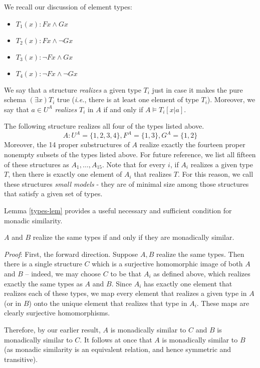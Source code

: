 We recall our discussion of element types:
\begin{itemize}
\item $T_1(x): Fx\wedge Gx$
\item $T_2(x): Fx\wedge \neg Gx$
\item $T_3(x): \neg Fx\wedge Gx$
\item $T_4(x): \neg Fx\wedge \neg Gx$
\end{itemize}
We say that a structure {\em realizes} a given type $T_i$ just in case it
makes the pure schema $(\exists x)T_i$ true (\textit{i.e.}, there is at least one element of type $T_i$). Moreover, we say that $a\in U^A$ \emph{realizes} $T_i$ in $A$ if and only if $A\models T_i[x|a]$.
\begin{example}\label{kinds-ex}
The following structure realizes all four of the types listed above.
\[A: U^A = \{1,2,3,4\}, F^A =\{1,3\}, G^A=\{1,2\}\]
Moreover, the 14 proper substructures of $A$ realize exactly the fourteen
proper nonempty subsets of the types listed above. For future reference, we list all fifteen of these structures as $A_1,\ldots,A_{15}$. Note that for every $i$, if $A_i$ realizes a given type $T$, then there is exactly one element of $A_i$ that realizes $T$. For this reason, we call these structures \emph{small models} - they are of minimal size among those structures that satisfy a given set of types.
\end{example}
Lemma \ref{types-lem} provides a useful necessary and sufficient condition for monadic similarity. 
\begin{lemma}\label{types-lem}
$A$ and $B$ realize the same types if and only if they are
monadically similar.
\end{lemma} 
\emph{Proof}:
First, the forward direction. Suppose $A, B$ realize the same types. Then there is a single structure $C$ which is a surjective homomorphic image of both $A$ and $B$ -- indeed, we may choose $C$ to be that $A_i$ as defined above, which realizes exactly the same types as $A$ and $B$. Since $A_i$ has exactly one element that realizes each of these types, we map every element that realizes a given type in $A$ (or in $B$) onto the unique element that realizes that type in $A_i$. These maps are clearly surjective homomorphisms. %

Therefore, by our earlier result, $A$ is monadically similar to $C$ and $B$ is
monadically similar to $C.$ It follows at once that $A$ is monadically similar
to $B$ (as monadic similarity is an equivalent relation, and hence symmetric and transitive). 

